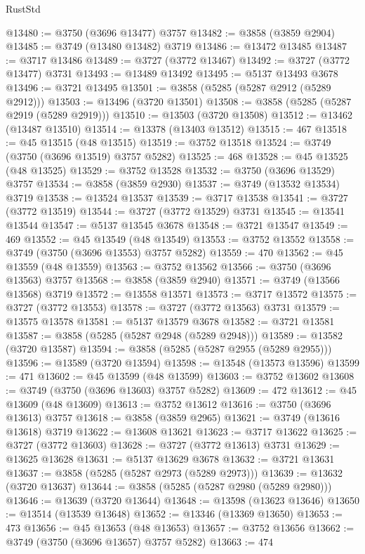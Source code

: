 \begin{lexlean}{RustStd}
\begin{coremodule}
@13480 := @3750 (@3696 @13477) @3757
@13482 := @3858 (@3859 @2904)
@13485 := @3749 (@13480 @13482) @3719
@13486 := @13472 @13485
@13487 := @3717 @13486
@13489 := @3727 (@3772 @13467)
@13492 := @3727 (@3772 @13477) @3731
@13493 := @13489 @13492
@13495 := @5137 @13493 @3678
@13496 := @3721 @13495
@13501 := @3858 (@5285 (@5287 @2912 (@5289 @2912)))
@13503 := @13496 (@3720 @13501)
@13508 := @3858 (@5285 (@5287 @2919 (@5289 @2919)))
@13510 := @13503 (@3720 @13508)
@13512 := @13462 (@13487 @13510)
@13514 := @13378 (@13403 @13512)
@13515 := 467
@13518 := @45 @13515 (@48 @13515)
@13519 := @3752 @13518
@13524 := @3749 (@3750 (@3696 @13519) @3757 @5282)
@13525 := 468
@13528 := @45 @13525 (@48 @13525)
@13529 := @3752 @13528
@13532 := @3750 (@3696 @13529) @3757
@13534 := @3858 (@3859 @2930)
@13537 := @3749 (@13532 @13534) @3719
@13538 := @13524 @13537
@13539 := @3717 @13538
@13541 := @3727 (@3772 @13519)
@13544 := @3727 (@3772 @13529) @3731
@13545 := @13541 @13544
@13547 := @5137 @13545 @3678
@13548 := @3721 @13547
@13549 := 469
@13552 := @45 @13549 (@48 @13549)
@13553 := @3752 @13552
@13558 := @3749 (@3750 (@3696 @13553) @3757 @5282)
@13559 := 470
@13562 := @45 @13559 (@48 @13559)
@13563 := @3752 @13562
@13566 := @3750 (@3696 @13563) @3757
@13568 := @3858 (@3859 @2940)
@13571 := @3749 (@13566 @13568) @3719
@13572 := @13558 @13571
@13573 := @3717 @13572
@13575 := @3727 (@3772 @13553)
@13578 := @3727 (@3772 @13563) @3731
@13579 := @13575 @13578
@13581 := @5137 @13579 @3678
@13582 := @3721 @13581
@13587 := @3858 (@5285 (@5287 @2948 (@5289 @2948)))
@13589 := @13582 (@3720 @13587)
@13594 := @3858 (@5285 (@5287 @2955 (@5289 @2955)))
@13596 := @13589 (@3720 @13594)
@13598 := @13548 (@13573 @13596)
@13599 := 471
@13602 := @45 @13599 (@48 @13599)
@13603 := @3752 @13602
@13608 := @3749 (@3750 (@3696 @13603) @3757 @5282)
@13609 := 472
@13612 := @45 @13609 (@48 @13609)
@13613 := @3752 @13612
@13616 := @3750 (@3696 @13613) @3757
@13618 := @3858 (@3859 @2965)
@13621 := @3749 (@13616 @13618) @3719
@13622 := @13608 @13621
@13623 := @3717 @13622
@13625 := @3727 (@3772 @13603)
@13628 := @3727 (@3772 @13613) @3731
@13629 := @13625 @13628
@13631 := @5137 @13629 @3678
@13632 := @3721 @13631
@13637 := @3858 (@5285 (@5287 @2973 (@5289 @2973)))
@13639 := @13632 (@3720 @13637)
@13644 := @3858 (@5285 (@5287 @2980 (@5289 @2980)))
@13646 := @13639 (@3720 @13644)
@13648 := @13598 (@13623 @13646)
@13650 := @13514 (@13539 @13648)
@13652 := @13346 (@13369 @13650)
@13653 := 473
@13656 := @45 @13653 (@48 @13653)
@13657 := @3752 @13656
@13662 := @3749 (@3750 (@3696 @13657) @3757 @5282)
@13663 := 474

\end{coremodule}
\end{lexlean}
